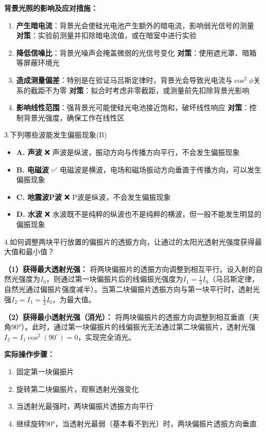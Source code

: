 \documentclass[10pt,a4paper]{ctexart}
\newcommand{\myspace}[1]{\par\vspace{#1\baselineskip}} %
\begin{document}
\textbf{背景光照的影响及应对措施：}
\begin{enumerate}
    \item \textbf{产生暗电流}：背景光会使硅光电池产生额外的暗电流，影响弱光信号的测量
    \quad \textbf{对策}：实验前测量并扣除暗电流值，或在暗室中进行实验
    
    \item \textbf{降低信噪比}：背景光噪声会掩盖微弱的光信号变化
    \quad \textbf{对策}：使用遮光罩、暗箱等屏蔽环境光
    
    \item \textbf{造成测量偏差}：特别是在验证马吕斯定律时，背景光会导致光电流与$\cos^2\phi$关系的截距不为零
    \quad \textbf{对策}：拟合时考虑非零截距，或测量前先扣除背景光影响
    
    \item \textbf{影响线性范围}：强背景光可能使硅光电池接近饱和，破坏线性响应
    \quad \textbf{对策}：控制背景光强度，确保工作在线性区
\end{enumerate}
\myspace{2}
3.下列哪些波能发生偏振现象(B)

\begin{itemize}
    \item \textbf{A. 声波} ❌ 声波是纵波，振动方向与传播方向平行，不会发生偏振现象
    \item \textbf{B. 电磁波} ✅ 电磁波是横波，电场和磁场振动方向垂直于传播方向，可以发生偏振现象
    \item \textbf{C. 地震波P波} ❌ P波是纵波，不会发生偏振现象
    \item \textbf{D. 水波} ❌ 水波既不是纯粹的纵波也不是纯粹的横波，但一般不能发生明显的偏振现象
\end{itemize}
\myspace{2}

4.如何调整两块平行放置的偏振片的透振方向，让通过的太阳光透射光强度获得最大值和最小值？

\textbf{（1）获得最大透射光强：}
将两块偏振片的透振方向调整到相互平行。设入射的自然光强度为$I_0$，则通过第一块偏振片后的线偏振光强度为$I_1 = \frac{1}{2}I_0$（马吕斯定律，自然光通过偏振片强度减半）。当第二块偏振片透振方向与第一块平行时，透射光强$I_2 = I_1 = \frac{1}{2}I_0$，为最大值。

\textbf{（2）获得最小透射光强（消光）：}
将两块偏振片的透振方向调整到相互垂直（夹角\ang{90}）。此时，通过第一块偏振片的线偏振光无法通过第二块偏振片，透射光强$I_2 = I_1\cos^2(90^\circ) = 0$，实现完全消光。

\textbf{实际操作步骤：}
\begin{enumerate}
    \item 固定第一块偏振片
    \item 旋转第二块偏振片，观察透射光强变化
    \item 当透射光最强时，两块偏振片透振方向平行
    \item 继续旋转\ang{90}，当透射光最弱（基本看不到光）时，两块偏振片透振方向垂直
\end{enumerate}
\newpage
\end{document}
